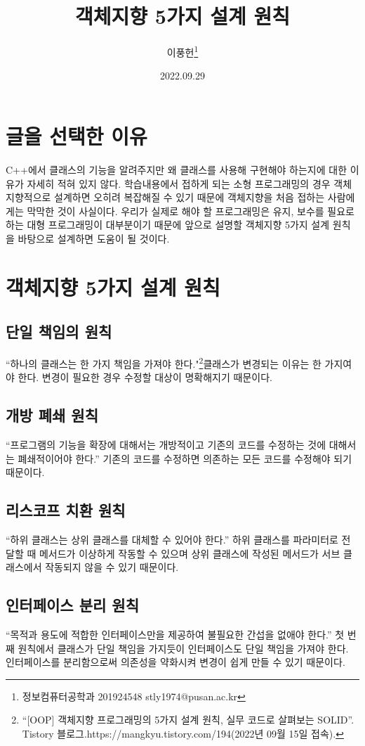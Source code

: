 \documentclass{article}
\title{객체지향 5가지 설계 원칙}
\author{이풍헌\footnote{정보컴퓨터공학과 201924548 stly1974@pusan.ac.kr}}
\date{2022.09.29}
\begin{document}
\maketitle

\section{글을 선택한 이유}
C++에서 클래스의 기능을 알려주지만 왜 클래스를 사용해 구현해야 하는지에 대한 이유가 자세히 적혀 있지 않다. 학습내용에서 접하게 되는 소형 프로그래밍의 경우 객체지향적으로 설계하면 오히려 복잡해질 수 있기 때문에 객체지향을 처음 접하는 사람에게는 막막한 것이 사실이다. 우리가 실제로 해야 할 프로그래밍은 유지, 보수를 필요로 하는 대형 프로그래밍이 대부분이기 때문에 앞으로 설명할 객체지향 5가지 설계 원칙을 바탕으로 설계하면 도움이 될 것이다.

\section{객체지향 5가지 설계 원칙}

\subsection{단일 책임의 원칙}
“하나의 클래스는 한 가지 책임을 가져야 한다."\footnote{“[OOP] 객체지향 프로그래밍의 5가지 설계 원칙, 실무 코드로 살펴보는 SOLID”.\\ Tistory 블로그.https://mangkyu.tistory.com/194(2022년 09월 15일 접속).}클래스가 변경되는 이유는 한 가지여야 한다. 변경이 필요한 경우 수정할 대상이 명확해지기 때문이다.
\subsection{개방 폐쇄 원칙}
“프로그램의 기능을 확장에 대해서는 개방적이고 기존의 코드를 수정하는 것에 대해서는 폐쇄적이어야 한다.” 기존의 코드를 수정하면 의존하는 모든 코드를 수정해야 되기 때문이다.
\subsection{리스코프 치환 원칙}
“하위 클래스는 상위 클래스를 대체할 수 있어야 한다.” 하위 클래스를 파라미터로 전달할 때 메서드가 이상하게 작동할 수 있으며 상위 클래스에 작성된 메서드가 서브 클래스에서 작동되지 않을 수 있기 때문이다.
\subsection{인터페이스 분리 원칙}
“목적과 용도에 적합한 인터페이스만을 제공하여 불필요한 간섭을 없애야 한다.” 첫 번째 원칙에서 클래스가 단일 책임을 가지듯이 인터페이스도 단일 책임을 가져야 한다. 인터페이스를 분리함으로써 의존성을 약화시켜 변경이 쉽게 만들 수 있기 때문이다.
\end{document}
